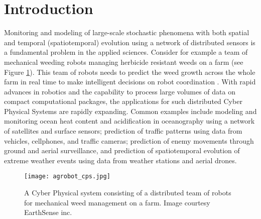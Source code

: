 \section{Introduction} \label{sec:intro}
Monitoring and modeling of large-scale stochastic phenomena with both spatial and temporal (spatiotemporal) evolution using a network of distributed sensors is a fundamental problem in the applied sciences.   Consider for example a team of mechanical weeding robots managing herbicide resistant weeds on a farm (see Figure \ref{fig:cps}). This team of robots needs to predict the weed growth across the whole farm in real time to make intelligent decisions on robot coordination \cite{McAllistar18IROS}. With rapid advances in robotics and the capability to process large volumes of data on compact computational packages, the applications for such distributed Cyber Physical Systems are rapidly expanding. Common examples include modeling and monitoring ocean heat content and acidification in oceanography using a network of satellites and surface sensors; prediction of traffic patterns using data from vehicles, cellphones, and traffic cameras; prediction of enemy movements through ground and aerial surveillance, and prediction of spatiotemporal evolution of extreme weather events using data from weather stations and aerial drones. %
 
\begin{figure}[h] %
	\centering
	\texttt{[image: agrobot\_cps.jpg]}
		\caption{A Cyber Physical system consisting of a distributed team of robots for mechanical weed management on a farm. Image courtesy EarthSense inc.}
	\label{fig:cps}
\end{figure}



